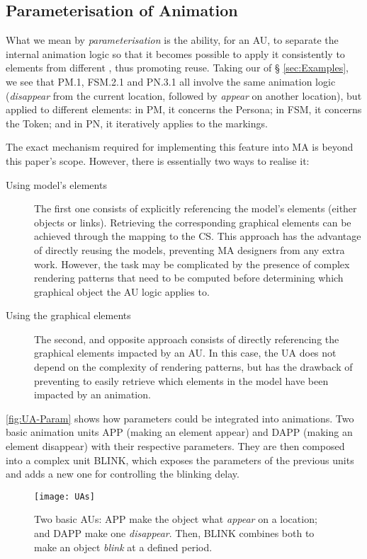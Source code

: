 \subsection{Parameterisation of Animation}
\label{sec:Param}

What we mean by \emph{parameterisation} is the ability, for an AU, to separate 
the internal animation logic so that it becomes possible to apply it consistently
to elements from different \DSLs, thus promoting reuse. Taking our \DSLs of \S 
\ref{sec:Examples}, we see that \textsf{PM.1}, \textsf{FSM.2.1} and \textsf{PN.3.1}
all involve the same animation logic (\emph{disappear} from the current location, 
followed by \emph{appear} on another location), but applied to different elements:
in \textsf{PM}, it concerns the \textsf{Persona}; in \textsf{FSM}, it concerns the
\textsf{Token}; and in \textsf{PN}, it iteratively applies to the markings.

The exact mechanism required for implementing this feature into MA is beyond this
paper's scope. However, there is essentially two ways to realise it:
\begin{description}
   \item[Using model's elements] The first one consists of explicitly referencing
   the model's elements (either objects or links). Retrieving the corresponding 
   graphical elements can be achieved through the mapping to the CS. This approach
   has the advantage of directly reusing the models, preventing MA designers from
   any extra work. However, the task may be complicated by the presence of complex
   rendering patterns that need to be computed before determining which graphical
   object the AU logic applies to.
   
   \item[Using the graphical elements] The second, and opposite approach consists
   of directly referencing the graphical elements impacted by an AU. In this case,
   the UA does not depend on the complexity of rendering patterns, but has the 
   drawback of preventing to easily retrieve which elements in the model have been
   impacted by an animation.
\end{description}

\autoref{fig:UA-Param} shows how parameters could be integrated into animations. 
Two basic animation units \textsf{APP} (making an element appear) and \textsf{DAPP}
(making an element disappear) with their respective parameters. They are then
composed into a complex unit \textsf{BLINK}, which exposes the parameters of
the previous units and adds a new one for controlling the blinking delay.

\begin{figure}[t]%
   \centering
   \texttt{[image: UAs]}%
   \caption{Two basic AUs: \textsf{APP} make the object \textsf{what} \emph{appear}
   \textsf{on} a location; and \textsf{DAPP} make one \emph{disappear}. Then,
   \textsf{BLINK} combines both to make an object \emph{blink} at a defined
   \textsf{period}.
   }%
   \label{fig:UA-Param}%
\end{figure}